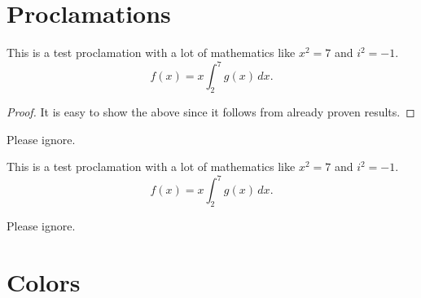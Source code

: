 \documentclass{TMarticle}
\begin{document}
\section{Proclamations}

\begin{theorem}[Euclid]
   This is a test proclamation with a lot of mathematics like $x^2 = 7$ and $i^2 = -1$.
   \[
       f(x) = x \int_2^7 g(x) \, dx.
   \]
\end{theorem}
\begin{proof}
   It is easy to show the above since it follows from already proven results.
\end{proof}
\begin{lemma}[TestLemma]
    Please ignore.
\end{lemma}
\begin{proposition}[Euclid]
   This is a test proclamation with a lot of mathematics like $x^2 = 7$ and $i^2 = -1$.
   \[
       f(x) = x \int_2^7 g(x) \, dx.
   \]
\end{proposition}
\begin{corollary}[Euclid 2]
    Please ignore.
\end{corollary}
\section{Colors}
\end{document}
